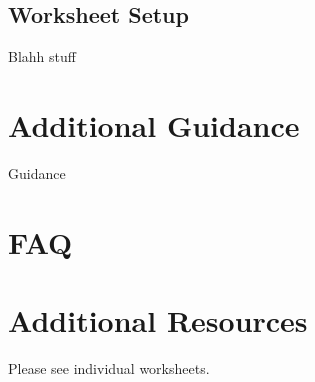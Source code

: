 \documentclass{../../fal_assignment}
\begin{document}
\subsection*{Worksheet Setup}

Blahh stuff

\section*{Additional Guidance}

Guidance

\section*{FAQ}

%    		
%    		
%    		

\section*{Additional Resources}

Please see individual worksheets.

\end{document}
